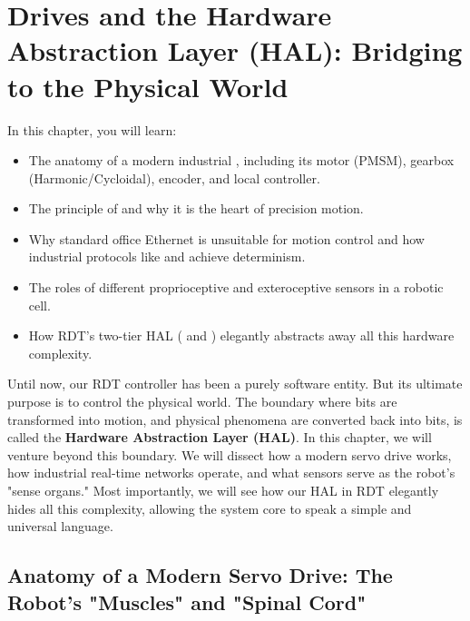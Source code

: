 
\justifying

\chapter{Drives and the Hardware Abstraction Layer (HAL): Bridging to the Physical World}
\label{chap:hal_and_drives}


\begin{navigationbox}{In this chapter, you will learn:}
    \begin{itemize}
        \item The anatomy of a modern industrial , including its motor (PMSM), gearbox (Harmonic/Cycloidal), encoder, and local controller.
        \item The principle of  and why it is the heart of precision motion.
        \item Why standard office Ethernet is unsuitable for motion control and how industrial protocols like  and  achieve determinism.
        \item The roles of different proprioceptive and exteroceptive sensors in a robotic cell.
        \item How RDT's two-tier HAL ( and ) elegantly abstracts away all this hardware complexity.
    \end{itemize}
\end{navigationbox}

Until now, our RDT controller has been a purely software entity. But its ultimate purpose is to control the physical world. The boundary where bits are transformed into motion, and physical phenomena are converted back into bits, is called the \textbf{Hardware Abstraction Layer (HAL)}. In this chapter, we will venture beyond this boundary. We will dissect how a modern servo drive works, how industrial real-time networks operate, and what sensors serve as the robot's "sense organs." Most importantly, we will see how our HAL in RDT elegantly hides all this complexity, allowing the system core to speak a simple and universal language.

\section{Anatomy of a Modern Servo Drive: The Robot's "Muscles" and "Spinal Cord"}
\label{sec:servo_drive_anatomy}

